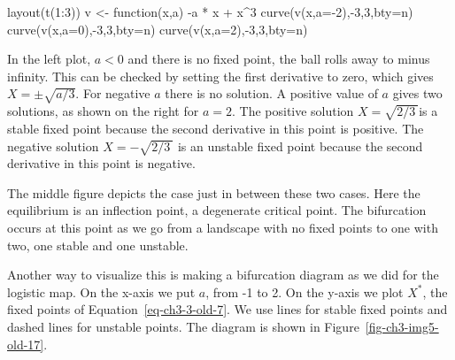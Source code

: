 \documentclass[
  a4paper,
  DIV=11,
  numbers=noendperiod,
  oneside]{scrreprt}
\newenvironment{Shaded}{\begin{snugshade}}{\end{snugshade}}
\newcommand{\AttributeTok}[1]{\textcolor[rgb]{0.40,0.45,0.13}{#1}}
\newcommand{\ControlFlowTok}[1]{\textcolor[rgb]{0.00,0.23,0.31}{#1}}
\newcommand{\DecValTok}[1]{\textcolor[rgb]{0.68,0.00,0.00}{#1}}
\newcommand{\FunctionTok}[1]{\textcolor[rgb]{0.28,0.35,0.67}{#1}}
\newcommand{\NormalTok}[1]{\textcolor[rgb]{0.00,0.23,0.31}{#1}}
\newcommand{\OtherTok}[1]{\textcolor[rgb]{0.00,0.23,0.31}{#1}}
\newcommand{\SpecialCharTok}[1]{\textcolor[rgb]{0.37,0.37,0.37}{#1}}
\newcommand{\StringTok}[1]{\textcolor[rgb]{0.13,0.47,0.30}{#1}}
\begin{document}
\begin{Shaded}
\begin{Highlighting}[]
\FunctionTok{layout}\NormalTok{(}\FunctionTok{t}\NormalTok{(}\DecValTok{1}\SpecialCharTok{:}\DecValTok{3}\NormalTok{))}
\NormalTok{v }\OtherTok{\textless{}{-}} \ControlFlowTok{function}\NormalTok{(x,a) }\SpecialCharTok{{-}}\NormalTok{a }\SpecialCharTok{*}\NormalTok{ x }\SpecialCharTok{+}\NormalTok{ x}\SpecialCharTok{\^{}}\DecValTok{3} 
\FunctionTok{curve}\NormalTok{(}\FunctionTok{v}\NormalTok{(x,}\AttributeTok{a=}\SpecialCharTok{{-}}\DecValTok{2}\NormalTok{),}\SpecialCharTok{{-}}\DecValTok{3}\NormalTok{,}\DecValTok{3}\NormalTok{,}\AttributeTok{bty=}\StringTok{\textquotesingle{}n\textquotesingle{}}\NormalTok{)}
\FunctionTok{curve}\NormalTok{(}\FunctionTok{v}\NormalTok{(x,}\AttributeTok{a=}\DecValTok{0}\NormalTok{),}\SpecialCharTok{{-}}\DecValTok{3}\NormalTok{,}\DecValTok{3}\NormalTok{,}\AttributeTok{bty=}\StringTok{\textquotesingle{}n\textquotesingle{}}\NormalTok{)}
\FunctionTok{curve}\NormalTok{(}\FunctionTok{v}\NormalTok{(x,}\AttributeTok{a=}\DecValTok{2}\NormalTok{),}\SpecialCharTok{{-}}\DecValTok{3}\NormalTok{,}\DecValTok{3}\NormalTok{,}\AttributeTok{bty=}\StringTok{\textquotesingle{}n\textquotesingle{}}\NormalTok{)}
\end{Highlighting}
\end{Shaded}

In the left plot, \(a < 0\) and there is no fixed point, the ball rolls
away to minus infinity. This can be checked by setting the first
derivative to zero, which gives \(X = \pm \sqrt{{a}/{3}}\). For negative
\(a\) there is no solution. A positive value of \(a\) gives two
solutions, as shown on the right for \(a = 2\). The positive solution
\(X = \sqrt{{2}/{3}\ }\)is a stable fixed point because the second
derivative in this point is positive. The negative solution
\(X = - \sqrt{{2}/{3}\ }\) is an unstable fixed point because the second
derivative in this point is negative.

The middle figure depicts the case just in between these two cases. Here
the equilibrium is an inflection point, a degenerate critical point. The
bifurcation occurs at this point as we go from a landscape with no fixed
points to one with two, one stable and one unstable.

Another way to visualize this is making a bifurcation diagram as we did
for the logistic map. On the x-axis we put \(a\), from -1 to 2. On the
y-axis we plot \(X^{*}\), the fixed points of
Equation~\ref{eq-ch3-3-old-7}. We use lines for stable fixed points and
dashed lines for unstable points. The diagram is shown in
Figure~\ref{fig-ch3-img5-old-17}.
\end{document}
